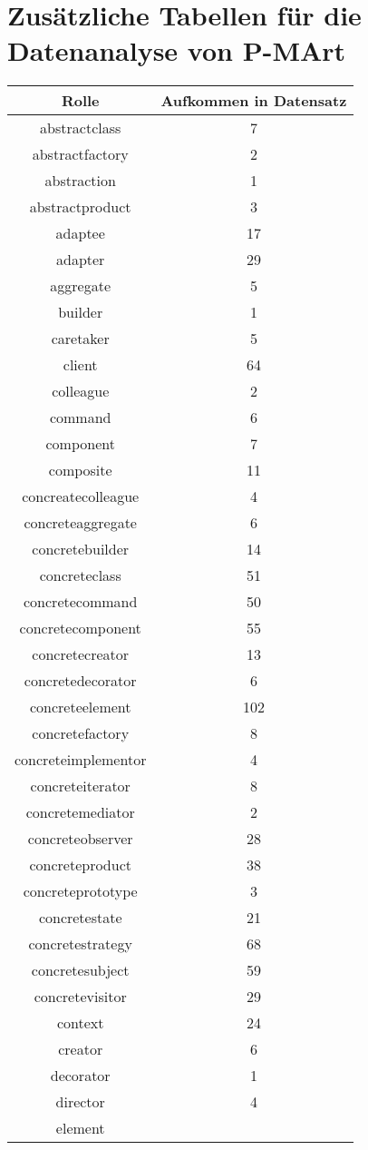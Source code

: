 \chapter{Zusätzliche Tabellen für die Datenanalyse von P-MArt}


\begin{table}[H]
    \centering
    \begin{tabular}{|c|c|}
        \hline
        Rolle & Aufkommen in Datensatz\\
        \hline
        abstractclass & 7\\abstractfactory & 2\\abstraction & 1\\abstractproduct & 3\\adaptee & 17\\adapter & 29\\aggregate & 5\\builder & 1\\caretaker & 5\\client & 64\\colleague & 2\\command & 6\\component & 7\\composite & 11\\concreatecolleague & 4\\concreteaggregate & 6\\concretebuilder & 14\\concreteclass & 51\\concretecommand & 50\\concretecomponent & 55\\concretecreator & 13\\concretedecorator & 6\\concreteelement & 102\\concretefactory & 8\\concreteimplementor & 4\\concreteiterator & 8\\concretemediator & 2\\concreteobserver & 28\\concreteproduct & 38\\concreteprototype & 3\\concretestate & 21\\concretestrategy & 68\\concretesubject & 59\\concretevisitor & 29\\context & 24\\creator & 6\\decorator & 1\\director & 4\\element 
\end{tabular}
\end{table}
